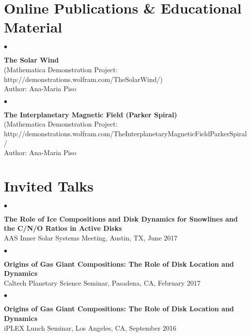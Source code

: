 \documentclass[margin,line]{res}
\newenvironment{list2}{
  \begin{list}{$\bullet$}{%
      \setlength{\itemsep}{0in}
      \setlength{\parsep}{0in} \setlength{\parskip}{0in}
      \setlength{\topsep}{0in} \setlength{\partopsep}{0in} 
      \setlength{\leftmargin}{0.2in}}}{\end{list}}
\begin{document}
\begin{resume}

\section{\sc Online Publications \& Educational Material}

\begin{list2}
\item[] {\bf The Solar Wind} \\
(Mathematica Demonstration Project: http://demonstrations.wolfram.com/TheSolarWind/) \\
Author: Ana-Maria Piso \\
\end{list2}

\vspace*{-.13in}
\begin{list2}
\item[] {\bf The Interplanetary Magnetic Field (Parker Spiral)} \\
(Mathematica Demonstration Project: \\
http://demonstrations.wolfram.com/TheInterplanetaryMagneticFieldParkerSpiral/ \\
Author: Ana-Maria Piso \\
\end{list2}

\section{\sc Invited Talks}

\begin{list2}
\item[] {\bf The Role of Ice Compositions and Disk Dynamics for Snowlines and the C/N/O Ratios in Active Disks} \\
AAS Inner Solar Systems Meeting, Austin, TX, June 2017\\
\end{list2}

\begin{list2}
\item[] {\bf Origins of Gas Giant Compositions: The Role of Disk Location and Dynamics} \\
Caltech Planetary Science Seminar, Pasadena, CA, February 2017\\
\end{list2}

\begin{list2}
\item[] {\bf Origins of Gas Giant Compositions: The Role of Disk Location and Dynamics} \\
iPLEX Lunch Seminar, Los Angeles, CA, September 2016\\
\end{list2}


\end{resume}
\end{document}
